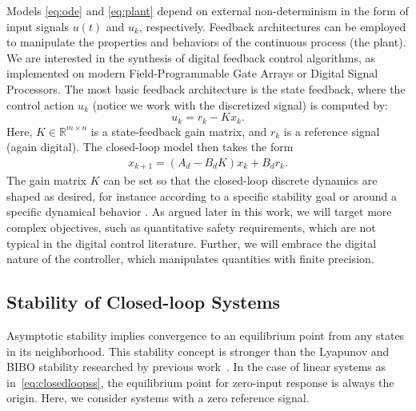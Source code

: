 \documentclass[runningheads,a4paper]{llncs}
\begin{document}
Models \eqref{eq:ode} and \eqref{eq:plant} depend on external non-determinism in the form of input signals $u (t)$ and  $u_k$, respectively. 
Feedback architectures can be employed to manipulate the properties and behaviors of the continuous process (the plant).   
We are interested in the synthesis of digital feedback control algorithms, 
as implemented on modern Field-Programmable Gate Arrays or Digital Signal Processors. 
The most basic feedback architecture is the state feedback, 
where the control action $u_k$ (notice we work with the discretized signal) is computed by: 
%
\begin{equation}
\label{eq:controlaction}
u_k = r_{k} - K x_k. 
\end{equation}
%
Here, $K \in \mathbb{R}^{m \times n}$ is a state-feedback gain matrix, 
and $r_{k}$ is a reference signal (again digital).   
%
The closed-loop model then takes the form 
\begin{align}
\label{eq:closedloopss}
x_{k+1} = ( A_d - B_d K ) x_k + B_d r_k.
\end{align}
%
The gain matrix $K$ can be set so that the closed-loop discrete dynamics are
shaped as desired, for instance according to a specific stability goal or
around a specific dynamical behavior \cite{astrom1997computer}.  As argued
later in this work, we will target more complex objectives, such as
quantitative safety requirements, which are not typical in the digital
control literature.  Further, we will embrace the digital nature of the
controller, which manipulates quantities with finite precision.

\subsection{Stability of Closed-loop Systems}
\label{ssec:stability}

Asymptotic stability implies convergence to an equilibrium point from any
states in its neighborhood.  This stability concept is stronger than the
Lyapunov and BIBO stability researched by previous
work~\cite{DBLP:conf/emsoft/RavanbakhshS16, hscc-paper,
DBLP:conf/hybrid/RouxJG15, DBLP:conf/hybrid/WangGRJF16}.  In the case of
linear systems as in~\eqref{eq:closedloopss}, the equilibrium point for
zero-input response is always the origin.  Here, we consider systems with a
zero reference signal.
\end{document}
